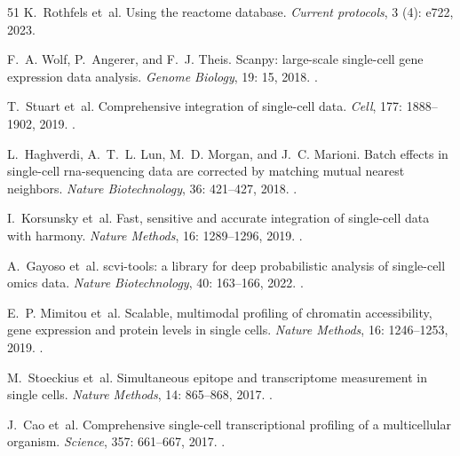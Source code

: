 \documentclass[10pt]{article}
\begin{document}
\begin{thebibliography}{51}
K.~Rothfels et~al.
\newblock Using the reactome database.
\newblock \emph{Current protocols}, 3 (4): e722, 2023.

F.~A. Wolf, P.~Angerer, and F.~J. Theis.
\newblock Scanpy: large-scale single-cell gene expression data analysis.
\newblock \emph{Genome Biology}, 19: 15, 2018.
\newblock {}.

T.~Stuart et~al.
\newblock Comprehensive integration of single-cell data.
\newblock \emph{Cell}, 177: 1888--1902, 2019.
\newblock {}.

L.~Haghverdi, A.~T.~L. Lun, M.~D. Morgan, and J.~C. Marioni.
\newblock Batch effects in single-cell rna-sequencing data are corrected by
  matching mutual nearest neighbors.
\newblock \emph{Nature Biotechnology}, 36: 421--427, 2018.
\newblock {}.

I.~Korsunsky et~al.
\newblock Fast, sensitive and accurate integration of single-cell data with
  harmony.
\newblock \emph{Nature Methods}, 16: 1289--1296, 2019.
\newblock {}.

A.~Gayoso et~al.
\newblock scvi-tools: a library for deep probabilistic analysis of single-cell
  omics data.
\newblock \emph{Nature Biotechnology}, 40: 163--166, 2022.
\newblock {}.

E.~P. Mimitou et~al.
\newblock Scalable, multimodal profiling of chromatin accessibility, gene
  expression and protein levels in single cells.
\newblock \emph{Nature Methods}, 16: 1246--1253, 2019.
\newblock {}.

M.~Stoeckius et~al.
\newblock Simultaneous epitope and transcriptome measurement in single cells.
\newblock \emph{Nature Methods}, 14: 865--868, 2017.
\newblock {}.

J.~Cao et~al.
\newblock Comprehensive single-cell transcriptional profiling of a
  multicellular organism.
\newblock \emph{Science}, 357: 661--667, 2017.
\newblock {}.


\end{thebibliography}
\end{document}
